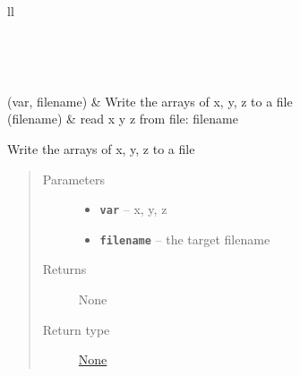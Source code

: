 \documentclass[letterpaper,10pt,english]{sphinxmanual}
\begin{document}
\begin{longtable}{ll}
\hline
\endfirsthead

%
{{}} \\
\hline
\endhead

\hline {} \\ \hline
\endfoot

\endlastfoot


{\hyperref[_autosummary/lorenz:lorenz.filehandling.write_x_y_z_tofile]{}}(var, filename)
 & 
Write the arrays of x, y, z to a file
\\
\hline
{\hyperref[_autosummary/lorenz:lorenz.filehandling.read_x_y_z_fromfile]{}}(filename)
 & 
read x y z from file: filename
\\
\hline\end{longtable}


\begin{fulllineitems}
\label{_autosummary/lorenz:lorenz.filehandling.write_x_y_z_tofile}
Write the arrays of x, y, z to a file
\begin{quote}\begin{description}
\item[{Parameters}] \leavevmode\begin{itemize}
\item {} 
\textbf{\texttt{var}} -- x, y, z

\item {} 
\textbf{\texttt{filename}} -- the target filename

\end{itemize}

\item[{Returns}] \leavevmode
None

\item[{Return type}] \leavevmode
\href{https://docs.python.org/library/constants.html\#None}{None}

\end{description}\end{quote}

\end{fulllineitems}
\end{document}
